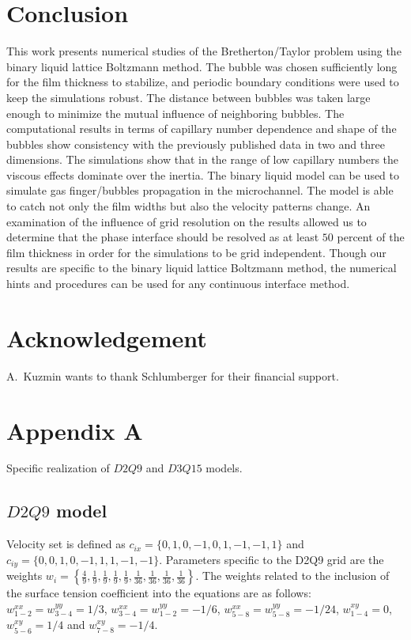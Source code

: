 \documentclass{CFD2011}
\begin{document}
\section{Conclusion}
This work presents numerical studies of the
Bretherton/Taylor problem using the binary liquid lattice Boltzmann method. The bubble was chosen
sufficiently long for the film
thickness to
stabilize, and periodic boundary conditions were used to keep the simulations robust. The
distance between bubbles was taken large enough to minimize
the mutual influence of neighboring bubbles. The computational
results in terms of capillary number dependence and shape of the bubbles show consistency with the
previously published data in two and three dimensions. The simulations show that in the range of low
capillary numbers the
viscous effects dominate over the inertia. The binary liquid model can be used to
simulate gas finger/bubbles propagation in the microchannel. The model is able to catch not only
the film widths but also the velocity patterns change. 
 An examination of the influence of grid resolution on the
results allowed
us to determine that the phase interface should be resolved as at least $50$ percent of the film
thickness
in order for the simulations to be grid independent. Though our results are specific to the binary
liquid lattice
Boltzmann method, the numerical hints and procedures can be used for any
continuous interface method. 

\section{Acknowledgement}
A.~Kuzmin wants to thank Schlumberger for their financial support.


%   

\section{Appendix A}
\label{app:models}
Specific realization of $D2Q9$ and $D3Q15$ models.
\subsection{$D2Q9$ model}
Velocity set is defined as $c_{ix}=\{0,1,0,-1,0,1,-1,-1,1\}$ and $c_{iy}=\{0,0,1,0,-1,1,1,-1,-1\}$.
Parameters specific to the D2Q9 grid are the weights
$w_i=\left\{\frac{4}{9},\frac{1}{9},\frac{1}{9},\frac{1}{9},\frac{1}{9},
\frac{1}{36},\frac{1}{36},\frac{1}{36},\frac{1}{36}\right\}$.  The weights related to the
inclusion of the surface tension coefficient into the equations are as follows:
$w^{xx}_{1-2}=w^{yy}_{3-4}=1/3$, $w^{xx}_{3-4}=w^{yy}_{1-2}=-1/6$,
$w^{xx}_{5-8}=w^{yy}_{5-8}=-1/24$, $w^{xy}_{1-4}=0$, $w^{xy}_{5-6}=1/4$ and
$w^{xy}_{7-8}=-1/4$.
\end{document}
